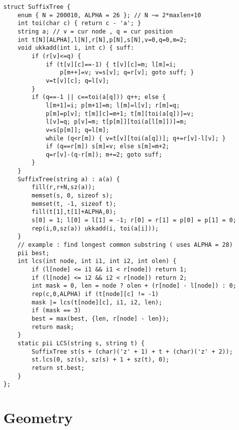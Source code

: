 \documentclass[a4paper,9pt]{article}
\begin{document}
\begin{lstlisting}
struct SuffixTree {
	enum { N = 200010, ALPHA = 26 }; // N ~= 2*maxlen+10
	int toi(char c) { return c - 'a'; }
	string a; // v = cur node , q = cur position
	int t[N][ALPHA],l[N],r[N],p[N],s[N],v=0,q=0,m=2;
	void ukkadd(int i, int c) { suff:
		if (r[v]<=q) {
			if (t[v][c]==-1) { t[v][c]=m; l[m]=i;
				p[m++]=v; v=s[v]; q=r[v]; goto suff; }
			v=t[v][c]; q=l[v];
		}
		if (q==-1 || c==toi(a[q])) q++; else {
			l[m+1]=i; p[m+1]=m; l[m]=l[v]; r[m]=q;
			p[m]=p[v]; t[m][c]=m+1; t[m][toi(a[q])]=v;
			l[v]=q; p[v]=m; t[p[m]][toi(a[l[m]])]=m;
			v=s[p[m]]; q=l[m];
			while (q<r[m]) { v=t[v][toi(a[q])]; q+=r[v]-l[v]; }
			if (q==r[m]) s[m]=v; else s[m]=m+2;
			q=r[v]-(q-r[m]); m+=2; goto suff;
		}
	}
	SuffixTree(string a) : a(a) {
		fill(r,r+N,sz(a));
		memset(s, 0, sizeof s);
		memset(t, -1, sizeof t);
		fill(t[1],t[1]+ALPHA,0);
		s[0] = 1; l[0] = l[1] = -1; r[0] = r[1] = p[0] = p[1] = 0;
		rep(i,0,sz(a)) ukkadd(i, toi(a[i]));
	}
	// example : find longest common substring ( uses ALPHA = 28)
	pii best;
	int lcs(int node, int i1, int i2, int olen) {
		if (l[node] <= i1 && i1 < r[node]) return 1;
		if (l[node] <= i2 && i2 < r[node]) return 2;
		int mask = 0, len = node ? olen + (r[node] - l[node]) : 0;
		rep(c,0,ALPHA) if (t[node][c] != -1)
		mask |= lcs(t[node][c], i1, i2, len);
		if (mask == 3)
		best = max(best, {len, r[node] - len});
		return mask;
	}
	static pii LCS(string s, string t) {
		SuffixTree st(s + (char)('z' + 1) + t + (char)('z' + 2));
		st.lcs(0, sz(s), sz(s) + 1 + sz(t), 0);
		return st.best;
	}
};
\end{lstlisting}

\section{Geometry}
\end{document}
